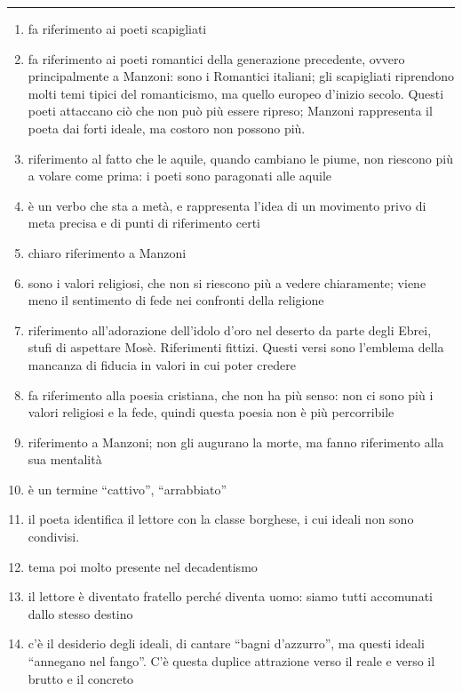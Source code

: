 \documentclass{book}
\begin{document}
\vspace*{1em}\hrule\vspace*{1em}

\begin{enumerate}
\item fa riferimento ai poeti scapigliati
\item  fa riferimento ai poeti
  romantici della generazione precedente, ovvero principalmente a
  Manzoni: sono i Romantici italiani; gli scapigliati riprendono molti
  temi tipici del romanticismo, ma quello europeo d'inizio secolo.
  Questi poeti attaccano ciò che non può più essere ripreso; Manzoni
  rappresenta il poeta dai forti ideale, ma costoro non possono più.
\item  riferimento al fatto che le aquile,
  quando cambiano le piume, non riescono più a volare come prima: i
  poeti sono paragonati alle aquile
\item è un verbo che sta a metà, e
  rappresenta l'idea di un movimento privo di meta precisa e di punti di
  riferimento certi
\item chiaro riferimento a Manzoni
\item sono i valori religiosi, che
  non si riescono più a vedere chiaramente; viene meno il sentimento di
  fede nei confronti della religione
\item riferimento all'adorazione
  dell'idolo d'oro nel deserto da parte degli Ebrei, stufi di aspettare
  Mosè. Riferimenti fittizi. Questi versi sono l'emblema della mancanza
  di fiducia in valori in cui poter credere
\item fa riferimento alla poesia
  cristiana, che non ha più senso: non ci sono più i valori religiosi e
  la fede, quindi questa poesia non è più percorribile
\item riferimento a Manzoni; non gli
  augurano la morte, ma fanno riferimento alla sua mentalità
\item è un termine ``cattivo'',
  ``arrabbiato''
\item il poeta identifica il lettore
  con la classe borghese, i cui ideali non sono condivisi.
\item tema poi molto presente nel
  decadentismo
  \item il lettore è diventato fratello perché diventa uomo: siamo tutti accomunati dallo stesso destino
\item c'è il desiderio degli ideali, di cantare ``bagni
  d'azzurro'', ma questi ideali ``annegano nel fango''. C'è questa
  duplice attrazione verso il reale e verso il brutto e il concreto
\end{enumerate}
\end{document}
